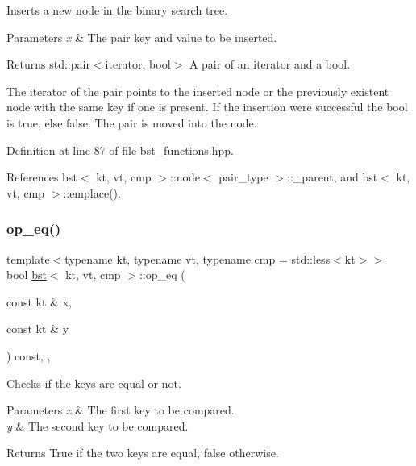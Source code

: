Inserts a new node in the binary search tree. 


\begin{DoxyParams}{Parameters}
{\em x} & The pair key and value to be inserted. \\
\hline
\end{DoxyParams}
\begin{DoxyReturn}{Returns}
std\+::pair$<$iterator, bool$>$ A pair of an iterator and a bool.
\end{DoxyReturn}
The iterator of the pair points to the inserted node or the previously existent node with the same key if one is present. If the insertion were successful the bool is true, else false. The pair is moved into the node. 

Definition at line 87 of file bst\+\_\+functions.\+hpp.



References bst$<$ kt, vt, cmp $>$\+::node$<$ pair\+\_\+type $>$\+::\+\_\+parent, and bst$<$ kt, vt, cmp $>$\+::emplace().

\mbox{\label{classbst_ad42afa310b7d0a4b4da251cd8bba6897}} 
\subsubsection{\texorpdfstring{op\+\_\+eq()}{op\_eq()}}
{\footnotesize\ttfamily template$<$typename kt, typename vt, typename cmp = std\+::less$<$kt$>$$>$ \\
bool \hyperlink{classbst}{bst}$<$ kt, vt, cmp $>$\+::op\+\_\+eq (\begin{DoxyParamCaption}\item[{const kt \&}]{x,  }\item[{const kt \&}]{y }\end{DoxyParamCaption}) const\hspace{0.3cm}{\ttfamily [inline]}, {\ttfamily [private]}, {\ttfamily [noexcept]}}



Checks if the keys are equal or not. 


\begin{DoxyParams}{Parameters}
{\em x} & The first key to be compared. \\
\hline
{\em y} & The second key to be compared. \\
\hline
\end{DoxyParams}
\begin{DoxyReturn}{Returns}
True if the two keys are equal, false otherwise. 
\end{DoxyReturn}


